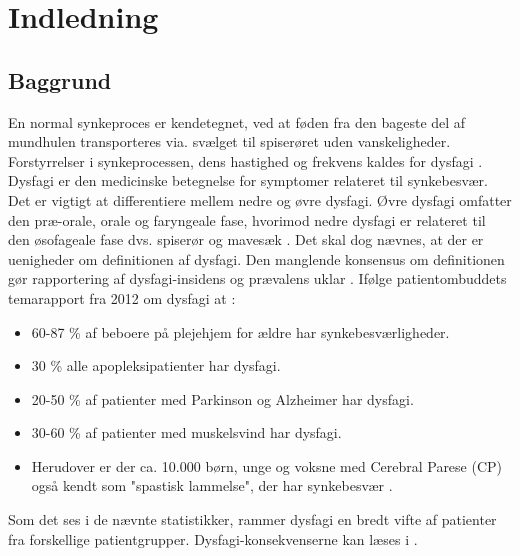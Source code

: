 \chapter{Indledning}

\section{Baggrund}
En normal synkeproces er kendetegnet, ved at føden  fra den bageste del af mundhulen transporteres via. svælget til spiserøret uden vanskeligheder. Forstyrrelser i synkeprocessen, dens hastighed og frekvens kaldes for dysfagi \cite{Sundhedsstyrelsen2015}. Dysfagi er den medicinske betegnelse for symptomer  relateret til synkebesvær. Det er vigtigt at differentiere mellem nedre og øvre dysfagi. Øvre dysfagi omfatter den præ-orale, orale og faryngeale fase, hvorimod nedre dysfagi er relateret til den øsofageale fase dvs. spiserør og mavesæk  \cite{Kjaersgaard2013}. Det skal dog nævnes, at der er uenigheder om definitionen af dysfagi. Den manglende konsensus om definitionen gør rapportering af dysfagi-insidens og prævalens uklar \cite{Kjaersgaard2013}. Ifølge patientombuddets temarapport fra 2012 om dysfagi at \cite{Bommersholdt2012}:

\begin{itemize}
\item 60-87 \% af beboere på plejehjem for ældre har synkebesværligheder.
\item 30 \% alle apopleksipatienter har dysfagi.
\item 20-50 \% af patienter med Parkinson og Alzheimer har dysfagi.
\item 30-60 \% af patienter med muskelsvind har dysfagi.
\item Herudover er der ca. 10.000 børn, unge og voksne med Cerebral Parese (CP) også kendt som "spastisk lammelse", der har synkebesvær . 
\end{itemize}

Som det ses i de nævnte statistikker, rammer dysfagi en bredt vifte af patienter fra forskellige patientgrupper. Dysfagi-konsekvenserne kan læses i . 

